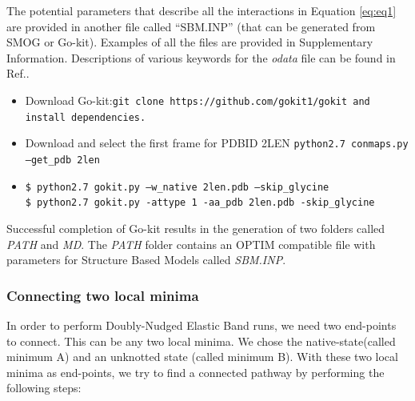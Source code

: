 \documentclass[journal=jacsat]{achemso}
\begin{document}
The potential parameters that describe all the interactions in Equation \ref{eq:eq1} are provided in another file called ``SBM.INP'' (that can be generated from SMOG\cite{smog} or Go-kit\cite{Neelamraju19a}). Examples of all the files are provided in Supplementary Information. Descriptions of various keywords for the \emph{odata} file can be found in Ref.\cite{OPTIM}. 

\begin{itemize}
\small
    \item {Download Go-kit\cite{Neelamraju19a}:\tt {git clone https://github.com/gokit1/gokit} and install dependencies.}
    \item{ Download and select the first frame for PDBID 2LEN \tt{python2.7 conmaps.py --get\_pdb 2len}}
    \item{ \tt{\$ python2.7 gokit.py --w\_native 2len.pdb --skip\_glycine \\ \$ python2.7 gokit.py -attype 1 -aa\_pdb 2len.pdb -skip\_glycine}}
\end{itemize}

Successful completion of Go-kit results in the generation of two folders called \emph{PATH} and \emph{MD}. The \emph{PATH} folder contains an OPTIM compatible file with parameters for Structure Based Models called \emph{SBM.INP}. 

\subsubsection{Connecting two local minima}

In order to perform Doubly-Nudged Elastic Band \cite{DNEB1,DNEB2} runs, we need two end-points to connect. This can be any two local minima. We chose the native-state(called minimum A) and an unknotted state (called minimum B). With these two local minima as end-points, we try to find a connected pathway by performing the following steps:
\end{document}
